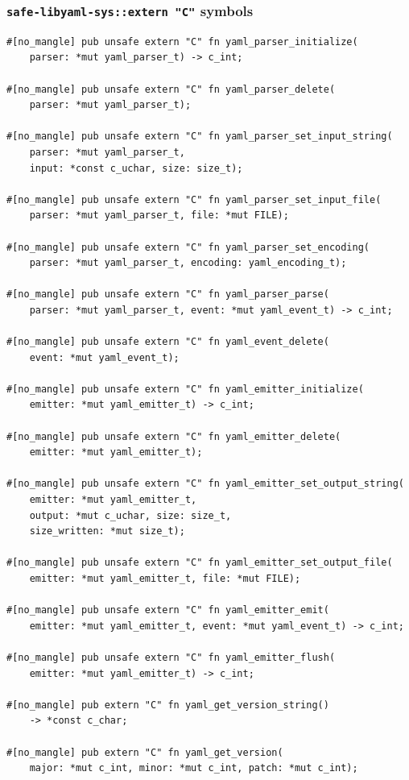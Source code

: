 \documentclass[12pt]{article}
\theoremstyle{definition}
\theoremstyle{remark}
\begin{document}
\subsubsection{\texttt{safe-libyaml-sys::extern "C"} symbols}
\begin{lstlisting}
#[no_mangle] pub unsafe extern "C" fn yaml_parser_initialize(
    parser: *mut yaml_parser_t) -> c_int;

#[no_mangle] pub unsafe extern "C" fn yaml_parser_delete(
    parser: *mut yaml_parser_t);

#[no_mangle] pub unsafe extern "C" fn yaml_parser_set_input_string(
    parser: *mut yaml_parser_t,
    input: *const c_uchar, size: size_t);

#[no_mangle] pub unsafe extern "C" fn yaml_parser_set_input_file(
    parser: *mut yaml_parser_t, file: *mut FILE);

#[no_mangle] pub unsafe extern "C" fn yaml_parser_set_encoding(
    parser: *mut yaml_parser_t, encoding: yaml_encoding_t);

#[no_mangle] pub unsafe extern "C" fn yaml_parser_parse(
    parser: *mut yaml_parser_t, event: *mut yaml_event_t) -> c_int;

#[no_mangle] pub unsafe extern "C" fn yaml_event_delete(
    event: *mut yaml_event_t);

#[no_mangle] pub unsafe extern "C" fn yaml_emitter_initialize(
    emitter: *mut yaml_emitter_t) -> c_int;

#[no_mangle] pub unsafe extern "C" fn yaml_emitter_delete(
    emitter: *mut yaml_emitter_t);

#[no_mangle] pub unsafe extern "C" fn yaml_emitter_set_output_string(
    emitter: *mut yaml_emitter_t,
    output: *mut c_uchar, size: size_t,
    size_written: *mut size_t);

#[no_mangle] pub unsafe extern "C" fn yaml_emitter_set_output_file(
    emitter: *mut yaml_emitter_t, file: *mut FILE);

#[no_mangle] pub unsafe extern "C" fn yaml_emitter_emit(
    emitter: *mut yaml_emitter_t, event: *mut yaml_event_t) -> c_int;

#[no_mangle] pub unsafe extern "C" fn yaml_emitter_flush(
    emitter: *mut yaml_emitter_t) -> c_int;

#[no_mangle] pub extern "C" fn yaml_get_version_string()
    -> *const c_char;

#[no_mangle] pub extern "C" fn yaml_get_version(
    major: *mut c_int, minor: *mut c_int, patch: *mut c_int);
\end{lstlisting}
\end{document}
